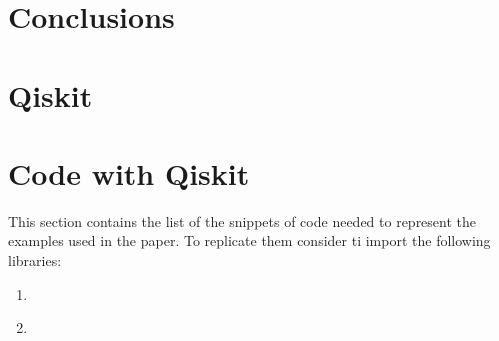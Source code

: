 \documentclass[english]{article}
\begin{document}
	\section{Conclusions}
	\label{sec:conclusions}
	
	\clearpage
	\begin{appendices}
		\section{Qiskit}
		\label{sec:qiskit}
			
		
		\section{Code with Qiskit}
		This section contains the list of the snippets of code needed to represent the examples used in the paper. To replicate them consider ti import the following libraries:
		
		
		\label{sec:codeWithQiskit}
			\begin{enumerate}
				\item \label{c:example3} 
				
				\item \label{c:example6} 
			\end{enumerate}
	\end{appendices}
	
	\clearpage
	
	\nocite{*}
	
\end{document}
